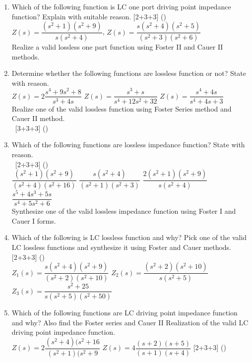 \documentclass[12pt]{article}
\newcommand{\enter}{\\\textcolor{white}{1}}
\begin{document}
\begin{enumerate}
				\item Which of the following function is LC one port driving point impedance function? Explain with suitable reason. \hfill [2+3+3] ()\\
				$Z(s) = \dfrac{(s^2+1)(s^2+9)}{s(s^2+4)}$, \hspace{2cm}
				$Z(s) = \dfrac{s(s^2+4)(s^2+5)}{(s^2+3)(s^2+6)}$\\
				Realize a valid lossless one part function using Foster II and Cauer II methods.
				
				\item Determine whether the following functions are lossless function or not? State with reason. \\
				$Z(s) = 2\dfrac{s^4+9s^2+8}{s^3+4s}$ \hspace{2cm}
				$Z(s) = \dfrac{s^3+s}{s^4+12s^2+32}$ \hspace{2cm}
				$Z(s) = \dfrac{s^4+4s}{s^4+4s+3}$\\
				Realize one of the valid lossless function using Foster Series method and Cauer II method.
				\enter\hfill [3+3+3] ()
				
				\item Which of the following functions are lossless impedance function? State with reason. 
				\enter\hfill [2+3+3] ()\\
				$\dfrac{(s^2+1)(s^2+9)}{(s^2+4)(s^2+16)}$ \hspace{1cm}
				$\dfrac{s(s^2+4)}{(s^2+1)(s^2+3)}$ \hspace{1cm}
				$\dfrac{2(s^2+1)(s^2+9)}{s(s^2+4)}$ \hspace{1cm}
				$\dfrac{s^5+4s^3+5s}{s^4+5s^2+6}$\\
				Synthesize one of the valid lossless impedance function using Foster I and Cauer I forms.	
				
				\item Which of the following is LC lossless function and why? Pick one of the valid LC lossless functions and synthesize it using Foster and Cauer methods. \hfill [2+3+3] ()\\
				$Z_1(s)=\dfrac{s(s^2+4)(s^2+9)}{(s^2+2)(s^2+10)}$ \hspace{2cm}
				$Z_2(s)=\dfrac{(s^2+2)(s^2+10)}{s(s^2+5)}$ \hspace{2cm}
				$Z_3(s)=\dfrac{s^2+25}{s(s^2+5)(s^2+50)}$
				
				\item Which of the following functions are LC driving point impedance function and why? Also find the Foster series and Cauer II Realization of the valid LC driving point impedance function.\\
				$Z(s) = 2\dfrac{(s^2+4)(s^2+16}{(s^2+1)(s^2+9}$ \hspace{2cm}
				$Z(s) = 4\dfrac{(s+2)(s+5)}{(s+1)(s+4)}$ \hfill [2+3+3] ()
								

\end{enumerate}
\end{document}
